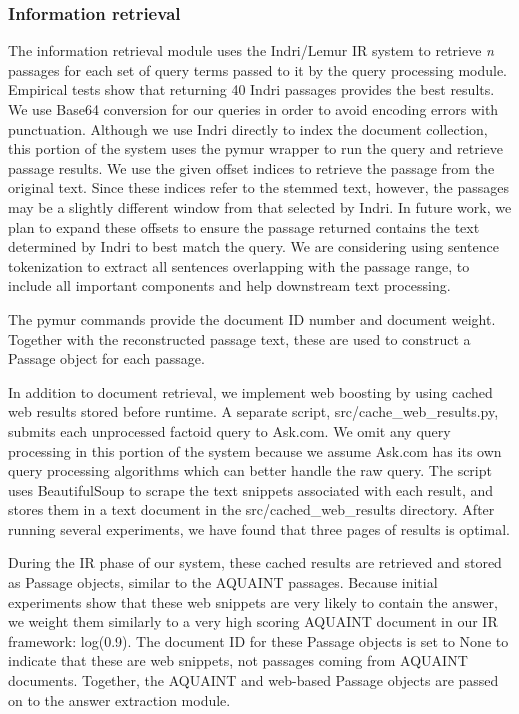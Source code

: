 \documentclass[11pt]{article}
\begin{document}
\subsubsection{Information retrieval}

The information retrieval module uses the Indri/Lemur IR system to retrieve \emph{n} passages for each set of query terms passed to it by the query processing module. Empirical tests show that returning 40 Indri passages provides the best results. We use Base64 conversion for our queries in order to avoid encoding errors with punctuation. Although we use Indri directly to index the document collection, this portion of the system uses the pymur wrapper to run the query and retrieve passage results. We use the given offset indices to retrieve the passage from the original text. Since these indices refer to the stemmed text, however, the passages may be a slightly different window from that selected by Indri. In future work, we plan to expand these offsets to ensure the passage returned contains the text determined by Indri to best match the query.  We are considering using sentence tokenization to extract all sentences overlapping with the passage range, to include all important components and help downstream text processing.

The pymur commands provide the document ID number and document weight. Together with the reconstructed passage text, these are used to construct a Passage object for each passage. 

In addition to document retrieval, we implement web boosting by using cached web results stored before runtime. A separate script, src/cache\_web\_results.py, submits each unprocessed factoid query to Ask.com. We omit any query processing in this portion of the system because we assume Ask.com has its own query processing algorithms which can better handle the raw query. The script uses BeautifulSoup to scrape the text snippets associated with each result, and stores them in a text document in the src/cached\_web\_results directory. After running several experiments, we have found that three pages of results is optimal. 

During the IR phase of our system, these cached results are retrieved and stored as Passage objects, similar to the AQUAINT passages. Because initial experiments show that these web snippets are very likely to contain the answer, we weight them similarly to a very high scoring AQUAINT document in our IR framework: log(0.9).  The document ID for these Passage objects is set to None to indicate that these are web snippets, not passages coming from AQUAINT documents.  Together, the AQUAINT and web-based Passage objects are passed on to the answer extraction module. 
\end{document}
